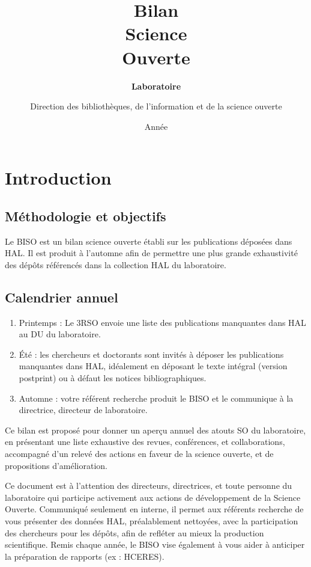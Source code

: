 \documentclass[french, 11pt]{dibiso/biso}
\title{Bilan \\ Science \\ Ouverte}
\author{Direction des bibliothèques, de l’information et de la science ouverte}
\date{Année \reportyear}
\subtitle{\textbf{Laboratoire \labacronym} \\
  \medskip
  \labfullname
}
\begin{document}
\renewcommand{\arraystretch}{1.5}


\maketitle

\tableofcontents

\pagebreak



\section{Introduction}


\subsection*{Méthodologie et objectifs }

Le BISO est un bilan science ouverte établi sur les publications déposées dans HAL. Il est produit à l’automne afin de permettre une plus grande exhaustivité des dépôts référencés dans la collection HAL du laboratoire. 


\subsection*{Calendrier annuel }

\begin{enumerate}
  \item Printemps : Le 3RSO envoie une liste des publications manquantes dans HAL au DU du laboratoire.
  \item Été : les chercheurs et doctorants sont invités à déposer les publications manquantes dans HAL, idéalement en déposant le texte intégral (version postprint) ou à défaut les notices bibliographiques.
  \item Automne : votre référent recherche produit le BISO et le communique à la directrice, directeur de laboratoire.
\end{enumerate}


Ce bilan est proposé pour donner un aperçu annuel des atouts SO du laboratoire, en présentant une liste exhaustive des revues, conférences, et collaborations, accompagné d’un relevé des actions en faveur de la science ouverte, et de propositions d’amélioration.

Ce document est à l’attention des directeurs, directrices, et toute personne du laboratoire qui participe activement aux actions de développement de la Science Ouverte. Communiqué seulement en interne, il permet aux référents recherche de vous présenter des données HAL, préalablement nettoyées, avec la participation des chercheurs pour les dépôts, afin de refléter au mieux la production scientifique. Remis chaque année,  le BISO vise également à vous aider à anticiper la préparation de rapports (ex : HCERES).
\end{document}
